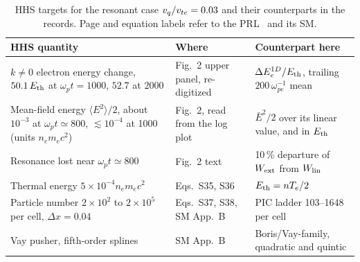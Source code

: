 \begin{table}[t]
\centering
\caption{HHS targets for the resonant case $v_q/v_{te}=0.03$ and their counterparts in the records. Page and equation labels refer to the PRL~\cite{HHS2026} and its SM.}\label{tab:c8-hhs}
\small
\begin{tabular}{@{}p{4.2cm}p{4.3cm}p{5.2cm}@{}}\toprule
HHS quantity & Where & Counterpart here\\\midrule
$k\neq0$ electron energy change, $50.1\,E_{\rm th}$ at $\omega_pt=1000$, $52.7$ at $2000$ & Fig.~2 upper panel, re-digitized & $\Delta E_e^{1D}/E_{\rm th}$, trailing $200\,\omega_{pe}^{-1}$ mean\\
Mean-field energy $\langle E^2\rangle/2$, about $10^{-3}$ at $\omega_pt\simeq800$, $\lesssim10^{-4}$ at 1000 (units $n_em_ec^2$) & Fig.~2, read from the log plot & $\bar E^2/2$ over its linear value, and in $E_{\rm th}$\\
Resonance lost near $\omega_pt\simeq800$ & Fig.~2 text & 10\,\% departure of $W_{\rm ext}$ from $W_{\rm lin}$\\
Thermal energy $5\times10^{-4}n_em_ec^2$ & Eqs.~S35, S36 & $E_{\rm th}=nT_e/2$\\
Particle number $2\times10^2$ to $2\times10^5$ per cell, $\Delta x=0.04$ & Eqs.~S37, S38, SM App.~B & PIC ladder 103--1648 per cell\\
Vay pusher, fifth-order splines & SM App.~B & Boris/Vay-family, quadratic and quintic\\\bottomrule
\end{tabular}
\end{table}
